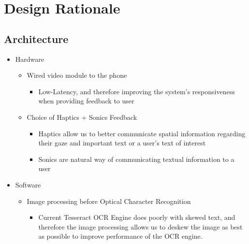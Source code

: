 \chapter{Design Rationale}

	\section{Architecture}
		\begin{itemize}
			\item Hardware
			\begin{itemize}
				\item Wired video module to the phone
				\begin{itemize}
					\item Low-Latency, and therefore improving the system's responsiveness when providing feedback to user
				\end{itemize}
				\item Choice of Haptics + Sonics Feedback
				\begin{itemize}
					\item Haptics allow us to better communicate spatial information regarding their gaze and important text or a user's text of interest
					\item Sonics are natural way of communicating textual information to a user
				\end{itemize}
			\end{itemize}


			\item Software
			\begin{itemize}
				\item Image processing before Optical Character Recognition
				\begin{itemize}
					\item Current Tesseract OCR Engine does poorly with skewed text, and therefore the image processing allows us to deskew the image as best as possible to improve performance of the OCR engine.
				\end{itemize}
			\end{itemize}
		\end{itemize}
\pagebreak



